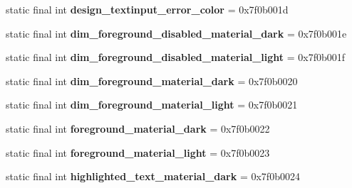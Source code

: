 \begin{DoxyCompactItemize}
\item 
\hypertarget{classandroid_1_1support_1_1design_1_1_r_1_1color_a61c393621d872716ef5c5c3eff744966}{}static final int {\bfseries design\+\_\+textinput\+\_\+error\+\_\+color} = 0x7f0b001d\label{classandroid_1_1support_1_1design_1_1_r_1_1color_a61c393621d872716ef5c5c3eff744966}

\item 
\hypertarget{classandroid_1_1support_1_1design_1_1_r_1_1color_a8365b6d42a0ee37da75c99119f8dd10a}{}static final int {\bfseries dim\+\_\+foreground\+\_\+disabled\+\_\+material\+\_\+dark} = 0x7f0b001e\label{classandroid_1_1support_1_1design_1_1_r_1_1color_a8365b6d42a0ee37da75c99119f8dd10a}

\item 
\hypertarget{classandroid_1_1support_1_1design_1_1_r_1_1color_aa3a60b269d7e33b90c2dad08aaf68b76}{}static final int {\bfseries dim\+\_\+foreground\+\_\+disabled\+\_\+material\+\_\+light} = 0x7f0b001f\label{classandroid_1_1support_1_1design_1_1_r_1_1color_aa3a60b269d7e33b90c2dad08aaf68b76}

\item 
\hypertarget{classandroid_1_1support_1_1design_1_1_r_1_1color_ab8a94cd46177343a91105b918d61508a}{}static final int {\bfseries dim\+\_\+foreground\+\_\+material\+\_\+dark} = 0x7f0b0020\label{classandroid_1_1support_1_1design_1_1_r_1_1color_ab8a94cd46177343a91105b918d61508a}

\item 
\hypertarget{classandroid_1_1support_1_1design_1_1_r_1_1color_abc2b9e0a3a6c52f660f46f0936055388}{}static final int {\bfseries dim\+\_\+foreground\+\_\+material\+\_\+light} = 0x7f0b0021\label{classandroid_1_1support_1_1design_1_1_r_1_1color_abc2b9e0a3a6c52f660f46f0936055388}

\item 
\hypertarget{classandroid_1_1support_1_1design_1_1_r_1_1color_a0d0dfa4680f7f421fba2e31829ad77ed}{}static final int {\bfseries foreground\+\_\+material\+\_\+dark} = 0x7f0b0022\label{classandroid_1_1support_1_1design_1_1_r_1_1color_a0d0dfa4680f7f421fba2e31829ad77ed}

\item 
\hypertarget{classandroid_1_1support_1_1design_1_1_r_1_1color_a63848c6f48c8f9f3196a62ebdd80a4ec}{}static final int {\bfseries foreground\+\_\+material\+\_\+light} = 0x7f0b0023\label{classandroid_1_1support_1_1design_1_1_r_1_1color_a63848c6f48c8f9f3196a62ebdd80a4ec}

\item 
\hypertarget{classandroid_1_1support_1_1design_1_1_r_1_1color_a6ab9e4175ec63197d0900ba09a0f97ea}{}static final int {\bfseries highlighted\+\_\+text\+\_\+material\+\_\+dark} = 0x7f0b0024\label{classandroid_1_1support_1_1design_1_1_r_1_1color_a6ab9e4175ec63197d0900ba09a0f97ea}


\end{DoxyCompactItemize}
